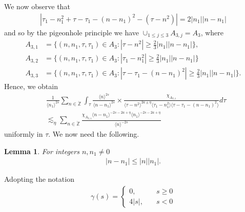\documentclass[12pt,reqno]{amsart}
\numberwithin{equation}{section}  %
\newcommand{\zz}{\mathbb{Z}}
\newcommand{\zzdot}{\dot{\zz}}
\newtheorem{lemma}[theorem]{Lemma}
\begin{document}
We now observe that
\begin{equation*}
\begin{split}
| \tau_{1} - n_{1}^{2} + \tau - \tau_{1} - (n - n_{1})^{2} - (\tau - n^{2}) | = 2| n_{1} || n - n_{1} |
\end{split}
\end{equation*}
and so by the pigeonhole principle we have $\cup_{1 \le j \le 3} A_{3,j} = A_{3}$, where 
\begin{align*}
A_{3,1}&=\{(n, n_1, \tau, \tau_1)\in A_3: |\tau-n^{2}|\ge \frac{2}{3} |n_{1}|| n - n_{1} |\},\\
A_{3,2}&=\{(n, n_1, \tau, \tau_1)\in A_3: |\tau_{1}-n_{1}^2|\ge \frac{2}{3} |n_{1}||n - n_{1}| \}\\
A_{3,3}&=\{(n, n_1, \tau, \tau_1)\in A_3: |\tau - \tau_{1}-(n - n_{1})^2|\ge \frac{2}{3} |n_{1}||n - n_{1}| \}.
\end{align*} 
Hence, we obtain
\begin{equation}
\label{region-4-1}
\begin{split}
&  \frac{1}{\langle n_{1} \rangle^{2s}} \sum_{n \in \zzdot} \int_{\tau} \frac{\langle n \rangle ^{2s}}{\langle n - n_{1}\rangle ^{2s}}  \times \frac{\chi_{A_{3,1}}}{\langle \tau - n^{2} \rangle^{2a \pm \eta} \langle
\tau_{1} - n_{1}^{2} \rangle  \langle \tau - \tau_{1} - (n - n_{1})^{2} \rangle} d \tau
\\
&  \lesssim_{\eta} \sum_{n \in \zzdot} \frac{\chi_{A_{3,1}}\langle n - n_{1} \rangle ^{-2s-2a + \eta } \langle n_{1} \rangle ^{-2s-2a + \eta}}{\langle
n\rangle ^{-2s}}
\end{split}
\end{equation}
uniformly in $\tau$. We now need the following.
\begin{lemma}
For integers $n, n_{1} \neq 0$
\begin{equation*}
\begin{split}
| n - n_{1} | \le | n | | n_{1}|.
\end{split}
\end{equation*}
\label{lem:key-trick}
\end{lemma}
Adopting the notation
\begin{equation*}
\begin{split}
\gamma(s) = 
\begin{cases} 0, \quad & s \ge 0
\\
4|s|, \quad & s < 0
\end{cases}
\end{split}
\end{equation*}
\end{document}
